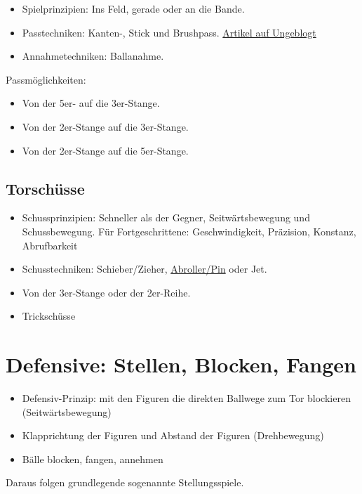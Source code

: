 \begin{itemize}
\item Spielprinzipien: Ins Feld, gerade oder an die Bande.
\item Passtechniken: Kanten-, Stick und Brushpass. 
\href{http://ungeblogtkickern.blogspot.de/2015/09/schrag-schieen.html}{Artikel auf Ungeblogt}
\item Annahmetechniken: Ballanahme.
\end{itemize}

Passmöglichkeiten:
\begin{itemize}
\item Von der 5er- auf die 3er-Stange.
\item Von der 2er-Stange auf die 3er-Stange.
\item Von der 2er-Stange auf die 5er-Stange.
\end{itemize}


\subsection{Torschüsse}
\label{technik:offensive:torschuesse}

\begin{itemize}
\item Schussprinzipien: Schneller als der Gegner, Seitwärtsbewegung und Schussbewegung. Für Fortgeschrittene: Geschwindigkeit, Präzision, Konstanz, Abrufbarkeit
\item Schusstechniken: Schieber/Zieher, \href{http://ungeblogtkickern.blogspot.de/2014/07/schritt-fur-schritt-pin-schieen.html}{Abroller/Pin} oder Jet.
\item Von der 3er-Stange oder der 2er-Reihe.
\item Trickschüsse
\end{itemize}





\section{Defensive: Stellen, Blocken, Fangen}
\label{technik:defensive}

\begin{itemize}
\item Defensiv-Prinzip: mit den Figuren die direkten Ballwege zum Tor blockieren (Seitwärtsbewegung)  
\item Klapprichtung der Figuren und Abstand der Figuren (Drehbewegung)
\item Bälle blocken, fangen, annehmen 
\end{itemize}
Daraus folgen grundlegende sogenannte Stellungsspiele.


